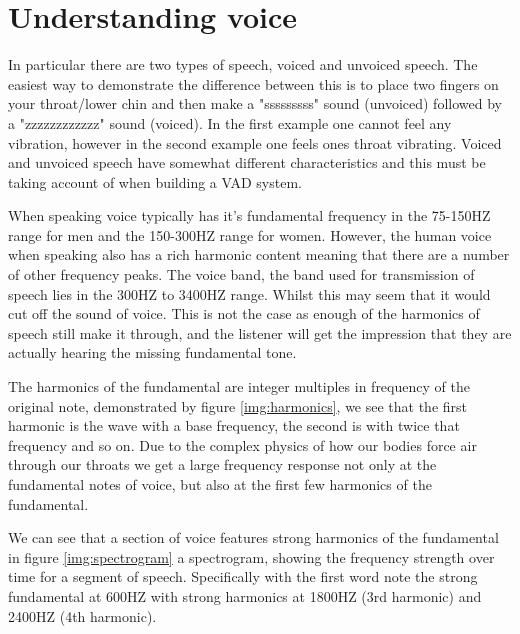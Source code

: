 \documentclass[ %
                    author={Sam Phippen},
                supervisor={Dr. Rafal Bogacz},
                     title={Real time voice activity detectors in noisy personal computing environments},
                  subtitle={},
                    degree={MEng},
                      year={2012} ]{thesis}
\begin{document}
\section{Understanding voice}

In particular there are two types of speech, voiced and unvoiced speech. The
easiest way to demonstrate the difference between this is to place two fingers
on your throat/lower chin and then make a "sssssssss" sound (unvoiced) followed
by a "zzzzzzzzzzzz" sound (voiced). In the first example one cannot feel any
vibration, however in the second example one feels ones throat vibrating.
Voiced and unvoiced speech have somewhat different characteristics and this
must be taking account of when building a VAD system.

When speaking voice typically has it's fundamental frequency in the 75-150HZ
range for men and the 150-300HZ range for women. However, the human voice when
speaking also has a rich harmonic content meaning that there are a number of
other frequency peaks. The voice band, the band used for transmission of speech
lies in the 300HZ to 3400HZ range. Whilst this may seem that it would cut off
the sound of voice. This is not the case as enough of the harmonics of speech
still make it through, and the listener will get the impression that they are
actually hearing the missing fundamental tone.

The harmonics of the fundamental are integer multiples in frequency of the
original note, demonstrated by figure \ref{img:harmonics}, we see that the
first harmonic is the wave with a base frequency, the second is with twice that
frequency and so on. Due to the complex physics of how our bodies force air through
our throats we get a large frequency response not only at the fundamental notes
of voice, but also at the first few harmonics of the fundamental.

We can see that a section of voice features strong harmonics of the fundamental
in figure \ref{img:spectrogram} a spectrogram, showing the frequency strength
over time for a segment of speech. Specifically with the first word note the
strong fundamental at 600HZ with strong harmonics at 1800HZ (3rd harmonic) and
2400HZ (4th harmonic).
\end{document}
